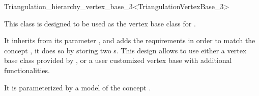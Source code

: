 

\begin{ccRefClass}{Triangulation_hierarchy_vertex_base_3<TriangulationVertexBase_3>}

\ccDefinition
  
This class is designed to be used as the vertex base class for
.

It inherits from its parameter , and adds the
requirements in order to match the concept
, it does so by storing two
s.  This design allows to use either a vertex base class
provided by \cgal, or a user customized vertex base with additional
functionalities.


\ccParameters

It is parameterized by a model of the concept .

\ccIsModel {}

\ccInheritsFrom {}


\ccSeeAlso
{}\\
\\

\end{ccRefClass}
